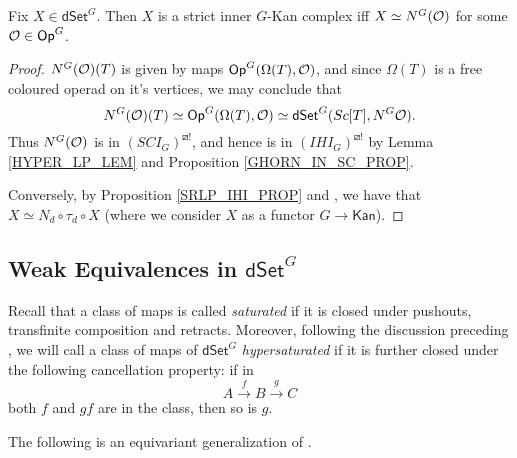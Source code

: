 \documentclass[a4paper,10pt,draft]{article}%
\begin{document}
\begin{corollary}
      Fix $X \in \mathsf{dSet}^G$. Then
      $X$ is a strict inner $G$-Kan complex iff $X \simeq N^G(\mathcal{O})$ for some $\mathcal{O} \in \mathsf{Op}^G$.
\end{corollary}
\begin{proof}
      $N^G(\mathcal{O})(T)$ is given by maps $\mathsf{Op}^G(\Omega(T), \mathcal{O})$,
      and since $\Omega(T)$ is a free coloured operad on it's vertices, we may conclude that
      \begin{equation}
            N^G(\mathcal{O})(T) \simeq \mathsf{Op}^G(\Omega(T), \mathcal{O}) \simeq \mathsf{dSet}^G(Sc[T], N^G\mathcal{O}).
      \end{equation}
      Thus $N^G(\mathcal{O})$ is in $(SCI_G)^{\boxslash !}$, and hence is in $(IHI_G)^{\boxslash !}$
      by Lemma \ref{HYPER_LP_LEM} and Proposition \ref{GHORN_IN_SC_PROP}.

      Conversely, by Proposition \ref{SRLP_IHI_PROP} and \cite[Theorem 6.1, Proposition 6.10]{MW09}, we have that
      $X \simeq N_d \circ \tau_d \circ X$
      (where we consider $X$ as a functor $G \to \mathsf{Kan}$).
\end{proof}














\subsection{Weak Equivalences in $\mathsf{dSet}^G$}

Recall that a class of maps is called \textit{saturated}
if it is closed under pushouts, transfinite composition and retracts.
Moreover, following the discussion preceding \cite[Prop. 3.6.8]{HHM16}, we will call a class of maps of $\mathsf{dSet}^G$ \textit{hypersaturated} if it is further closed under the following cancellation property: if in
\[
A \xrightarrow{f} B \xrightarrow{g} C
\]
both $f$ and $gf$ are in the class, then so is $g$.

The following is an equivariant generalization of 
\cite[Props. 2.4 and 2.5]{CM13a}.
\end{document}
